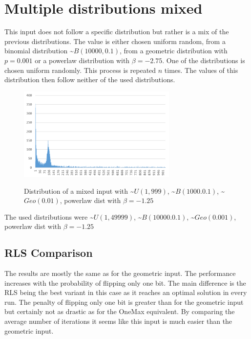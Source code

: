 \section{Multiple distributions mixed}
This input does not follow a specific distribution but rather is a mix of the previous distributions.
The value is either chosen uniform random, from a binomial distribution \textasciitilde$B(10000, 0.1)$, from a geometric distribution with $p=0.001$ or a powerlaw distribution with $\beta=-2.75$.
One of the distributions is chosen uniform randomly.
This process is repeated $n$ times.
The values of this distribution then follow neither of the used distributions.

\begin{figure}[h]
      \caption{Distribution of a mixed input with \textasciitilde$U(1,999)$, \textasciitilde$B(1000.0.1)$, \textasciitilde$Geo(0.01)$, powerlaw dist with $\beta=-1.25$}
      \centering
      \includegraphics[width=0.7\textwidth]{figures/images/numberGenerator/mixed.png}\label{fig:mixedDistExample}
\end{figure}

The used distributions were \textasciitilde$U(1,49999)$, \textasciitilde$B(10000.0.1)$, \textasciitilde$Geo(0.001)$, powerlaw dist with $\beta=-1.25$
\subsection{RLS Comparison}




The results are mostly the same as for the geometric input.
The performance increases with the probability of flipping only one bit.
The main difference is the RLS being the best variant in this case as it reaches an optimal solution in every run.
The penalty of flipping only one bit is greater than for the geometric input but certainly not as drastic as for the OneMax equivalent.
By comparing the average number of iterations it seems like this input is much easier than the geometric input.
